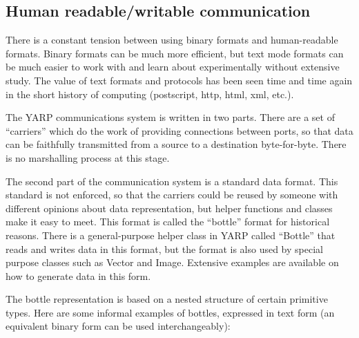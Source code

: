 



\subsection{Human readable/writable communication}

There is a constant tension between using binary formats and
human-readable formats.  Binary formats can be much more efficient,
but text mode formats can be much easier to work with and learn about
experimentally without extensive study.  The value of text formats and
protocols has been seen time and time again in the short history of
computing (postscript, http, html, xml, etc.).

The YARP communications system is written in two parts.  There
are a set of ``carriers'' which do the work of providing
connections between ports, so that data can be faithfully 
transmitted from a source to a destination byte-for-byte.
There is no marshalling process at this stage.

The second part of the communication system is a standard data format.
This standard is not enforced, so that the carriers could be reused by
someone with different opinions about data representation, but helper
functions and classes make it easy to meet.  This format is called the
``bottle'' format for historical reasons.  There is a general-purpose
helper class in YARP called ``Bottle'' that reads and writes data in
this format, but the format is also used by special purpose classes
such as Vector and Image.  Extensive examples are available on how
to generate data in this form.

The bottle representation is based on a nested structure of certain
primitive types.  Here are some informal examples of bottles,
expressed in text form (an equivalent binary form can be used
interchangeably):

